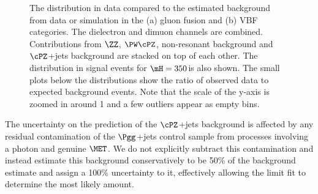 \begin{figure}[htbp]
\begin{center}
\caption{The \MET distribution in data compared to the estimated background from data or simulation
in the (a) gluon fusion and (b) VBF categories. 
The dielectron and dimuon channels are combined.
Contributions from $\ZZ$, $\PW\cPZ$, non-resonant background and $\cPZ$+jets background are stacked
on top of each other. The \MET distribution in signal events for $\mH = 350$\GeV is also shown. The small plots below the \MET distributions show the ratio
of observed data to expected background events. Note that the scale of the y-axis is zoomed in around 1 and a few outliers appear as empty bins.}
\label{fig:zgamma_met_data}
\end{center}
\end{figure}

The uncertainty on the prediction of the $\cPZ$+jets background is affected by any
residual contamination of the $\Pgg$+jets control sample from processes involving
a photon and genuine $\MET$. We do not explicitly subtract this contamination and 
instead estimate this background conservatively to be 50\% 
of the background estimate and assign a 100\% uncertainty to it, effectively allowing the limit fit to determine the most likely amount. 

